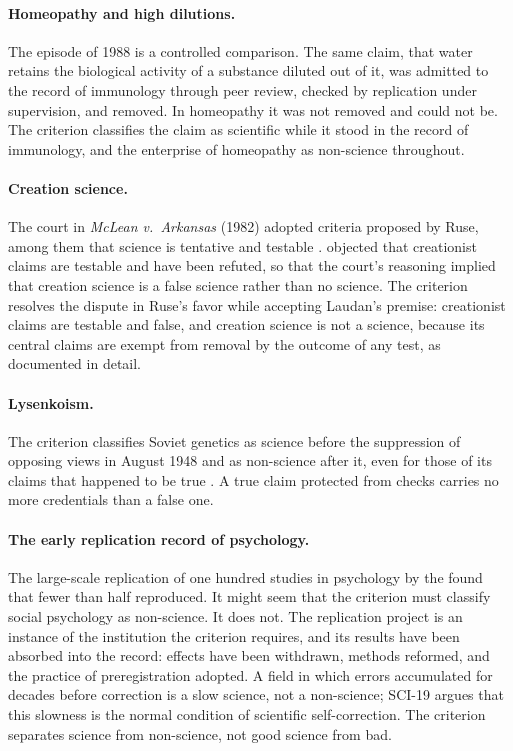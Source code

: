 \documentclass{situationist-preprint}
\begin{document}
\paragraph{Homeopathy and high dilutions.} The episode of 1988 is a controlled comparison. The same claim, that water retains the biological activity of a substance diluted out of it, was admitted to the record of immunology through peer review, checked by replication under supervision, and removed. In homeopathy it was not removed and could not be. The criterion classifies the claim as scientific while it stood in the record of immunology, and the enterprise of homeopathy as non-science throughout.

\paragraph{Creation science.} The court in \emph{McLean v.\ Arkansas} (1982) adopted criteria proposed by Ruse, among them that science is tentative and testable \citep{Ruse1982}. \citet{Laudan1982} objected that creationist claims are testable and have been refuted, so that the court's reasoning implied that creation science is a false science rather than no science. The criterion resolves the dispute in Ruse's favor while accepting Laudan's premise: creationist claims are testable and false, and creation science is not a science, because its central claims are exempt from removal by the outcome of any test, as \citet{Kitcher1982} documented in detail.

\paragraph{Lysenkoism.} The criterion classifies Soviet genetics as science before the suppression of opposing views in August 1948 and as non-science after it, even for those of its claims that happened to be true \citep{Joravsky1970}. A true claim protected from checks carries no more credentials than a false one.

\paragraph{The early replication record of psychology.} The large-scale replication of one hundred studies in psychology by the \citet{OSC2015} found that fewer than half reproduced. It might seem that the criterion must classify social psychology as non-science. It does not. The replication project is an instance of the institution the criterion requires, and its results have been absorbed into the record: effects have been withdrawn, methods reformed, and the practice of preregistration adopted. A field in which errors accumulated for decades before correction is a slow science, not a non-science; SCI-19 argues that this slowness is the normal condition of scientific self-correction. The criterion separates science from non-science, not good science from bad.
\end{document}
